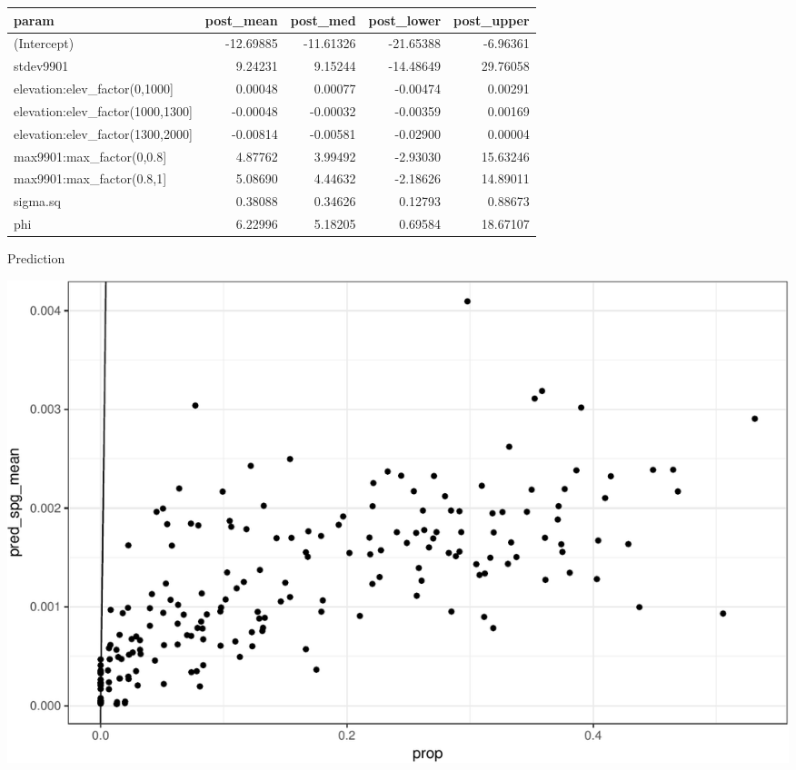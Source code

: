 \documentclass[11pt,ignorenonframetext,]{beamer}
\newenvironment{Shaded}{}{}
\newcommand{\KeywordTok}[1]{\textcolor[rgb]{0.00,0.44,0.13}{\textbf{#1}}}
\newcommand{\DataTypeTok}[1]{\textcolor[rgb]{0.56,0.13,0.00}{#1}}
\newcommand{\DecValTok}[1]{\textcolor[rgb]{0.25,0.63,0.44}{#1}}
\newcommand{\StringTok}[1]{\textcolor[rgb]{0.25,0.44,0.63}{#1}}
\newcommand{\OperatorTok}[1]{\textcolor[rgb]{0.40,0.40,0.40}{#1}}
\newcommand{\NormalTok}[1]{#1}
\let\oldShaded\Shaded
\let\endoldShaded\endShaded
\renewenvironment{Shaded}{\footnotesize\begin{spacing}{0.9}\oldShaded}{\endoldShaded\end{spacing}}
\begin{document}
\begin{frame}[fragile]{}

\footnotesize

\begin{Shaded}
\end{Shaded}

\begin{longtable}[]{@{}lrrrr@{}}
\toprule
param & post\_mean & post\_med & post\_lower &
post\_upper\tabularnewline
\midrule
\endhead
(Intercept) & -12.69885 & -11.61326 & -21.65388 &
-6.96361\tabularnewline
stdev9901 & 9.24231 & 9.15244 & -14.48649 & 29.76058\tabularnewline
elevation:elev\_factor(0,1000{]} & 0.00048 & 0.00077 & -0.00474 &
0.00291\tabularnewline
elevation:elev\_factor(1000,1300{]} & -0.00048 & -0.00032 & -0.00359 &
0.00169\tabularnewline
elevation:elev\_factor(1300,2000{]} & -0.00814 & -0.00581 & -0.02900 &
0.00004\tabularnewline
max9901:max\_factor(0,0.8{]} & 4.87762 & 3.99492 & -2.93030 &
15.63246\tabularnewline
max9901:max\_factor(0.8,1{]} & 5.08690 & 4.44632 & -2.18626 &
14.89011\tabularnewline
sigma.sq & 0.38088 & 0.34626 & 0.12793 & 0.88673\tabularnewline
phi & 6.22996 & 5.18205 & 0.69584 & 18.67107\tabularnewline
\bottomrule
\end{longtable}

\end{frame}

\begin{frame}{Prediction}

\includegraphics{Lec21_files/figure-beamer/unnamed-chunk-10-1.pdf}

\end{frame}
\end{document}
